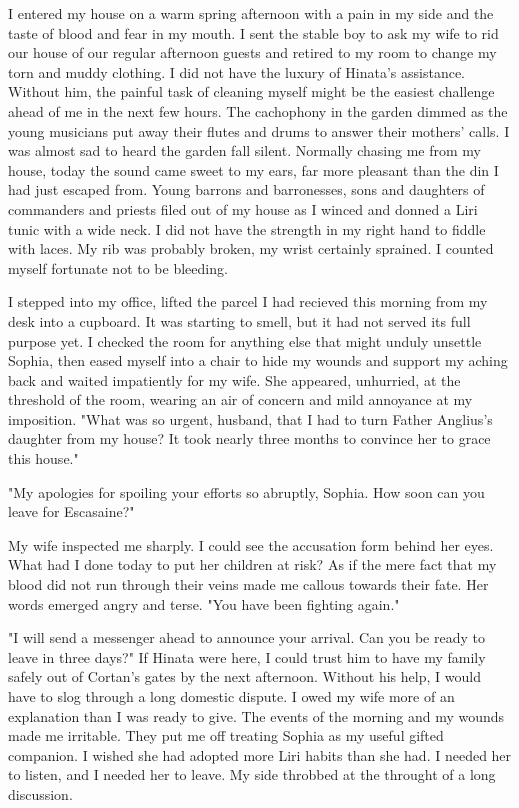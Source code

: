 \documentclass{article}
\begin{document}
\vspace{.5cm}

I entered my house on a warm spring afternoon with a pain in my side and the taste of blood and fear in my mouth. I sent the stable boy to ask my wife to rid our house of our regular afternoon guests and retired to my room to change my torn and muddy clothing. I did not have the luxury of Hinata's assistance. Without him, the painful task of cleaning myself might be the easiest challenge ahead of me in the next few hours. The cachophony in the garden dimmed as the young musicians put away their flutes and drums to answer their mothers' calls. I was almost sad to heard the garden fall silent. Normally chasing me from my house, today the sound came sweet to my ears, far more pleasant than the din I had just escaped from. Young barrons and barronesses, sons and daughters of commanders and priests filed out of my house as I winced and donned a Liri tunic with a wide neck. I did not have the strength in my right hand to fiddle with laces. My rib was probably broken, my wrist certainly sprained. I counted myself fortunate not to be bleeding. 

I stepped into my office, lifted the parcel I had recieved this morning from my desk into a cupboard. It was starting to smell, but it had not served its full purpose yet. I checked the room for anything else that might unduly unsettle Sophia, then eased myself into a chair to hide my wounds and support my aching back and waited impatiently for my wife. She appeared, unhurried, at the threshold of the room, wearing an air of concern and mild annoyance at my imposition. "What was so urgent, husband, that I had to turn Father Anglius's daughter from my house? It took nearly three months to convince her to grace this house."

"My apologies for spoiling your efforts so abruptly, Sophia. How soon can you leave for Escasaine?"

My wife inspected me sharply. I could see the accusation form behind her eyes. What had I done today to put her children at risk? As if the mere fact that my blood did not run through their veins made me callous towards their fate. Her words emerged angry and terse. "You have been fighting again."

"I will send a messenger ahead to announce your arrival. Can you be ready to leave in three days?" If Hinata were here, I could trust him to have my family safely out of Cortan's gates by the next afternoon. Without his help, I would have to slog through a long domestic dispute. I owed my wife more of an explanation than I was ready to give. The events of the morning and my wounds made me irritable. They put me off treating Sophia as my useful gifted companion. I wished she had adopted more Liri habits than she had. I needed her to listen, and I needed her to leave. My side throbbed at the throught of a long discussion.
\end{document}
